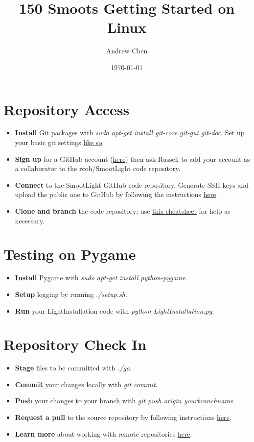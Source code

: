 \documentclass{article}
\begin{document}
    \title{150 Smoots Getting Started on Linux}
    \author{Andrew Chen}
    \date{\today}
    \maketitle
	\section{Repository Access}
		\begin{itemize} 
			\item \textbf{Install} Git packages with \emph{sudo apt-get install git-core git-gui git-doc}. Set up your basic git settings \href{http://help.github.com/git-email-settings/}{like so}.
			\item \textbf{Sign up} for a GitHub account (\href{https://github.com/signup/free}{here}) then ask Russell to add your account as a collaborator to the rcoh/SmootLight code repository.
			\item \textbf{Connect} to the SmootLight GitHub code repository. Generate SSH keys and upload the public one to GitHub by following the instructions \href{http://help.github.com/linux-key-setup/}{here}.
			\item \textbf{Clone and branch} the code repository; use \href{http://help.github.com/git-cheat-sheets/}{this cheatsheet} for help as necessary.
		\end{itemize}
	\section{Testing on Pygame}
		\begin{itemize} 
			\item \textbf{Install} Pygame with \emph{sudo apt-get install python-pygame}.
			\item \textbf{Setup} logging by running \emph{./setup.sh}.
			\item \textbf{Run} your LightInstallation code with \emph{python LightInstallation.py}.
		\end{itemize}
	\section{Repository Check In}
		\begin{itemize}
			\item \textbf{Stage} files to be committed with \emph{./ga}.
			\item \textbf{Commit} your changes locally with \emph{git commit}.
			\item \textbf{Push} your changes to your branch with \emph{git push origin yourbranchname}.
			\item \textbf{Request a pull} to the source repository by following instructions \href{http://help.github.com/pull-requests/}{here}.
			\item \textbf{Learn more} about working with remote repositories \href{http://help.github.com/remotes/}{here}.
		\end{itemize}
\end{document}
